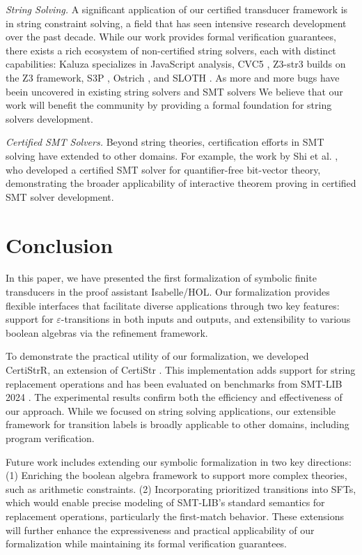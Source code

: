 \documentclass[sigplan,10pt,anonymous,review]{acmart}\settopmatter{printfolios=true,printccs=false,printacmref=false}
\begin{document}
\emph{String Solving.} A significant application of our certified transducer framework is in string constraint solving, a field that has seen intensive research development over the past decade. While our work provides formal verification guarantees, there exists a rich ecosystem of non-certified string solvers, each with distinct capabilities: Kaluza \cite{Berkeley-JavaScript} specializes in JavaScript analysis, CVC5 \cite{cvc5}, Z3-str3 \cite{Z3-str3} builds on the Z3 framework, S3P \cite{DBLP:conf/ccs/TrinhCJ14}, Ostrich \cite{pacmpl/ChenFHHHKLRW22}, and SLOTH \cite{HJLRV18}.
As more and more bugs have beein uncovered in existing string solvers \cite{DBLP:conf/cav/BlotskyMBZKG18} and SMT solvers \cite{Mansur20} 
We believe that our work will benefit the community by providing a formal foundation for string solvers development.



\emph{Certified SMT Solvers.} Beyond string theories, certification efforts in SMT solving have extended to other domains. For example, the work by Shi et al. \cite{DBLP:conf/cav/ShiFLTWY20}, who developed a certified SMT solver for quantifier-free bit-vector theory, demonstrating the broader applicability of interactive theorem proving in certified SMT solver development.


\section{Conclusion}
\label{sec:conclusion}

In this paper, we have presented the first formalization of symbolic finite transducers in the proof assistant Isabelle/HOL. Our formalization provides flexible interfaces that facilitate diverse applications through two key features: support for $\varepsilon$-transitions in both inputs and outputs, and extensibility to various boolean algebras via the refinement framework.

To demonstrate the practical utility of our formalization, we developed CertiStrR, an extension of CertiStr \cite{cpp/KanLRS22}. This implementation adds support for string replacement operations and has been evaluated on benchmarks from SMT-LIB 2024 \cite{smtlib_benchmarks}. The experimental results confirm both the efficiency and effectiveness of our approach. While we focused on string solving applications, our extensible framework for transition labels is broadly applicable to other domains, including program verification.

Future work includes extending our symbolic formalization in two key directions:
%
(1) Enriching the boolean algebra framework to support more complex theories, such as arithmetic constraints.
(2) Incorporating prioritized transitions into SFTs, which would enable precise modeling of SMT-LIB's standard semantics for replacement operations, particularly the first-match behavior.
These extensions will further enhance the expressiveness and practical applicability of our formalization while maintaining its formal verification guarantees.




\end{document}
